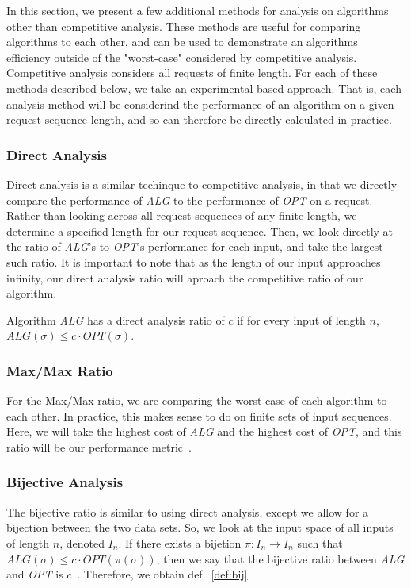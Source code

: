 In this section, we present a few additional methods for analysis on algorithms other than competitive analysis. These methods are useful for comparing algorithms to each other, and can be used to demonstrate an algorithms efficiency outside of the "worst-case" considered by competitive analysis. Competitive analysis considers all requests of finite length. For each of these methods described below, we take an experimental-based approach. That is, each analysis method will be considerind the performance of an algorithm on a given request sequence length, and so can therefore be directly calculated in practice.

\subsubsection*{Direct Analysis}
\label{sec:Direct}
Direct analysis is a similar techinque to competitive analysis, in that we directly compare the performance of \textit{ALG} to the performance of \textit{OPT} on a request. Rather than looking across all request sequences of any finite length, we determine a specified length for our request sequence. Then, we look directly at the ratio of \textit{ALG}'s to \textit{OPT}'s performance for each input, and take the largest such ratio. It is important to note that as the length of our input approaches infinity, our direct analysis ratio will aproach the competitive ratio of our algorithm.

\begin{definition}
    \label{def:direct}
    Algorithm \textit{ALG} has a direct analysis ratio of $c$ if for every input \s of length $n$, $ALG(\sigma) \leq c\cdot OPT(\sigma)$.
\end{definition}

\subsubsection*{Max/Max Ratio}
\label{sec:MaxMax}
For the Max/Max ratio, we are comparing the worst case of each algorithm to each other. In practice, this makes sense to do on finite sets of input sequences. Here, we will take the highest cost of \textit{ALG} and the highest cost of \textit{OPT}, and this ratio will be our performance metric~\cite{MAXMAX2005}. 

\subsubsection*{Bijective Analysis}
\label{sec:Bij}
The bijective ratio is similar to using direct analysis, except we allow for a bijection between the two data sets. So, we look at the input space of all inputs of length $n$, denoted $I_n$. If there exists a bijetion $\pi:I_n \rightarrow I_n$ such that $ALG(\sigma) \leq c\cdot OPT(\pi(\sigma))$, then  we say that the bijective ratio between \textit{ALG} and \textit{OPT} is $c$~\cite{bij2016}. Therefore, we obtain def.~\ref{def:bij}. 

